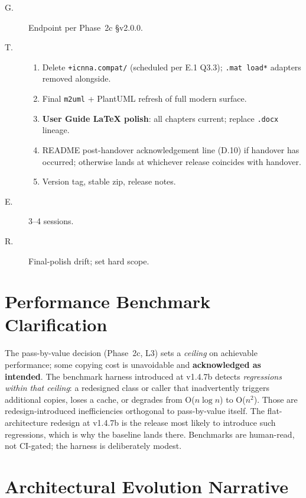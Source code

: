 \documentclass[11pt,a4paper]{article}
\begin{document}
\begin{description}
    \item[G.] Endpoint per Phase~2c \S v2.0.0.
    \item[T.]
        \begin{enumerate}[nosep]
            \item Delete \texttt{+icnna.compat/} (scheduled per E.1 Q3.3); \texttt{.mat load*} adapters removed alongside.
            \item Final \texttt{m2uml} + PlantUML refresh of full modern surface.
            \item \textbf{User Guide LaTeX polish}: all chapters current; replace \texttt{.docx} lineage.
            \item README post-handover acknowledgement line (D.10) if handover has occurred; otherwise lands at whichever release coincides with handover.
            \item Version tag, stable zip, release notes.
        \end{enumerate}
    \item[E.] 3--4 sessions.
    \item[R.] Final-polish drift; set hard scope.
\end{description}

\section{Performance Benchmark Clarification}
\label{sec:benchmarkclarification}

The pass-by-value decision (Phase~2c, L3) sets a \emph{ceiling} on achievable performance; some copying cost is unavoidable and \textbf{acknowledged as intended}. The benchmark harness introduced at v1.4.7b detects \emph{regressions within that ceiling}: a redesigned class or caller that inadvertently triggers additional copies, loses a cache, or degrades from O($n\log n$) to O($n^2$). Those are redesign-introduced inefficiencies orthogonal to pass-by-value itself. The flat-architecture redesign at v1.4.7b is the release most likely to introduce such regressions, which is why the baseline lands there. Benchmarks are human-read, not CI-gated; the harness is deliberately modest.

\section{Architectural Evolution Narrative}
\end{document}
